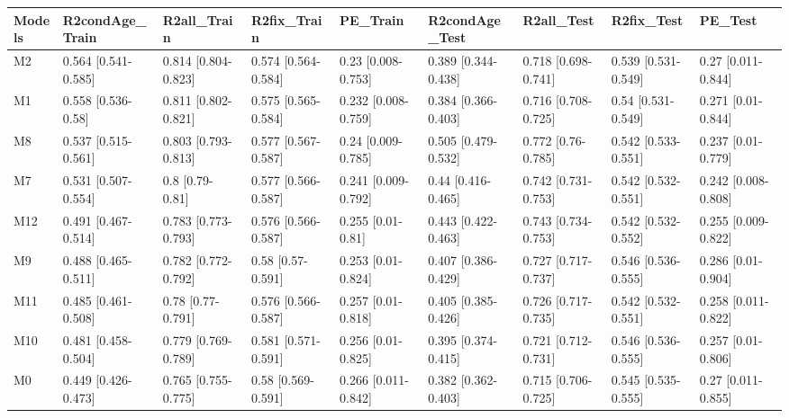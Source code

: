 \begin{table}[ht]
\centering
\begin{tabular}{lllllllll}
  \hline
Models & R2condAge\_Train & R2all\_Train & R2fix\_Train & PE\_Train & R2condAge\_Test & R2all\_Test & R2fix\_Test & PE\_Test \\ 
  \hline
M2 & 0.564 [0.541-0.585] & 0.814 [0.804-0.823] & 0.574 [0.564-0.584] & 0.23 [0.008-0.753] & 0.389 [0.344-0.438] & 0.718 [0.698-0.741] & 0.539 [0.531-0.549] & 0.27 [0.011-0.844] \\ 
  M1 & 0.558 [0.536-0.58] & 0.811 [0.802-0.821] & 0.575 [0.565-0.584] & 0.232 [0.008-0.759] & 0.384 [0.366-0.403] & 0.716 [0.708-0.725] & 0.54 [0.531-0.549] & 0.271 [0.01-0.844] \\ 
  M8 & 0.537 [0.515-0.561] & 0.803 [0.793-0.813] & 0.577 [0.567-0.587] & 0.24 [0.009-0.785] & 0.505 [0.479-0.532] & 0.772 [0.76-0.785] & 0.542 [0.533-0.551] & 0.237 [0.01-0.779] \\ 
  M7 & 0.531 [0.507-0.554] & 0.8 [0.79-0.81] & 0.577 [0.566-0.587] & 0.241 [0.009-0.792] & 0.44 [0.416-0.465] & 0.742 [0.731-0.753] & 0.542 [0.532-0.551] & 0.242 [0.008-0.808] \\ 
  M12 & 0.491 [0.467-0.514] & 0.783 [0.773-0.793] & 0.576 [0.566-0.587] & 0.255 [0.01-0.81] & 0.443 [0.422-0.463] & 0.743 [0.734-0.753] & 0.542 [0.532-0.552] & 0.255 [0.009-0.822] \\ 
  M9 & 0.488 [0.465-0.511] & 0.782 [0.772-0.792] & 0.58 [0.57-0.591] & 0.253 [0.01-0.824] & 0.407 [0.386-0.429] & 0.727 [0.717-0.737] & 0.546 [0.536-0.555] & 0.286 [0.01-0.904] \\ 
  M11 & 0.485 [0.461-0.508] & 0.78 [0.77-0.791] & 0.576 [0.566-0.587] & 0.257 [0.01-0.818] & 0.405 [0.385-0.426] & 0.726 [0.717-0.735] & 0.542 [0.532-0.551] & 0.258 [0.011-0.822] \\ 
  M10 & 0.481 [0.458-0.504] & 0.779 [0.769-0.789] & 0.581 [0.571-0.591] & 0.256 [0.01-0.825] & 0.395 [0.374-0.415] & 0.721 [0.712-0.731] & 0.546 [0.536-0.555] & 0.257 [0.01-0.806] \\ 
  M0 & 0.449 [0.426-0.473] & 0.765 [0.755-0.775] & 0.58 [0.569-0.591] & 0.266 [0.011-0.842] & 0.382 [0.362-0.403] & 0.715 [0.706-0.725] & 0.545 [0.535-0.555] & 0.27 [0.011-0.855] \\ 
   \hline
\end{tabular}
\end{table}
